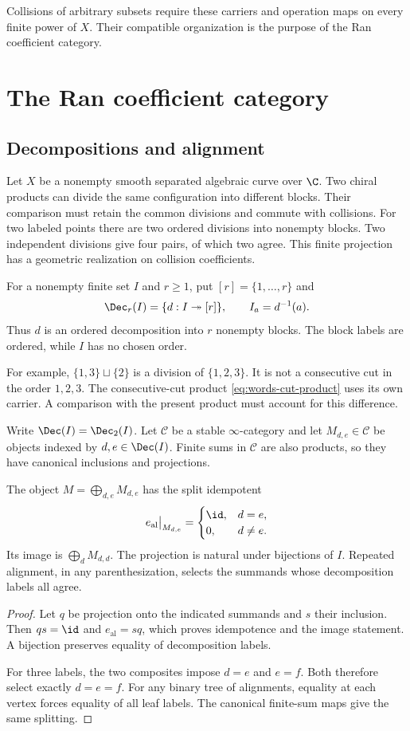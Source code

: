 Collisions of arbitrary subsets require these carriers and operation
maps on every finite power of $X$. Their compatible organization is
the purpose of the Ran coefficient category.

\chapter{The Ran coefficient category}
\section{Decompositions and alignment}
Let $X$ be a nonempty smooth separated algebraic curve over $\C$.
Two chiral products can divide the same configuration into different blocks.
Their comparison must retain the common divisions and commute with collisions.
For two labeled points there are two ordered divisions into nonempty blocks.
Two independent divisions give four pairs, of which two agree.
This finite projection has a geometric realization on collision coefficients.

For a nonempty finite set $I$ and $r\geq1$, put $[r]=\{1,\ldots,r\}$ and
\[
 \Dec_r(I)=\{d:I\twoheadrightarrow[r]\},\qquad
 I_a=d^{-1}(a).
\]
Thus $d$ is an ordered decomposition into $r$ nonempty blocks.
The block labels are ordered, while $I$ has no chosen order.

For example, $\{1,3\}\sqcup\{2\}$ is a division of $\{1,2,3\}$.
It is not a consecutive cut in the order $1,2,3$.
The consecutive-cut product \eqref{eq:words-cut-product} uses its own carrier.
A comparison with the present product must account for this difference.

Write $\Dec(I)=\Dec_2(I)$. Let $\mathcal C$ be a stable $\infty$-category and let
$M_{d,e}\in\mathcal C$ be objects indexed by $d,e\in\Dec(I)$.
Finite sums in $\mathcal C$ are also products, so they have canonical
inclusions and projections.

\begin{proposition}
\label{cbc:ran:finite}
The object $M=\bigoplus_{d,e}M_{d,e}$ has the split idempotent
\[
 e_{\mathrm{al}}\big|_{M_{d,e}}=
 \begin{cases}\id,&d=e,\\0,&d\ne e.\end{cases}
\]
Its image is $\bigoplus_d M_{d,d}$. The projection is natural under
bijections of $I$. Repeated alignment, in any parenthesization, selects
the summands whose decomposition labels all agree.
\end{proposition}
\begin{proof}
Let $q$ be projection onto the indicated summands and $s$ their inclusion.
Then $qs=\id$ and $e_{\mathrm{al}}=sq$, which proves idempotence and the
image statement. A bijection preserves equality of decomposition labels.

For three labels, the two composites impose $d=e$ and $e=f$.
Both therefore select exactly $d=e=f$.
For any binary tree of alignments, equality at each vertex forces equality
of all leaf labels. The canonical finite-sum maps give the same splitting.
\end{proof}

